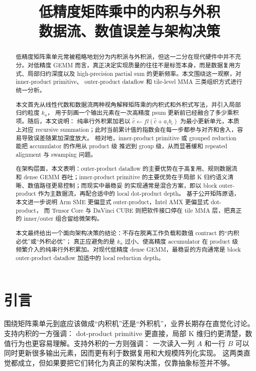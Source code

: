 \documentclass[UTF8,11pt,a4paper]{ctexart}
\title{\textbf{低精度矩阵乘中的内积与外积}\\
\large 数据流、数值误差与架构决策}
\author{}
\date{}
\newcommand{\ku}{\ensuremath{k_u}}
\begin{document}
\maketitle

\begin{abstract}
低精度矩阵乘单元常被粗略地划分为内积派与外积派，但这一二分在现代硬件中并不充分。对低精度
GEMM 而言，真正决定实现质量的往往不是标签本身，而是数据复用方式、局部归约深度以及
high-precision partial sum 的更新频率。本文围绕这一观察，对 inner-product primitive、
outer-product dataflow 和 tile-level MMA 三类组织方式进行统一分析。

本文首先从线性代数和数据流两种视角解释矩阵乘的内积式和外积式写法，并引入局部归约粒度 \ku{}，
用于刻画一个输出元素在一次高精度 psum 更新前已经融合了多少乘积项。随后，本文说明：
纯串行外积累加若以 $\hat{c}\leftarrow fl(\hat{c}+a_ib_i)$ 为最小更新单元，本质上对应
recursive summation；此时当前累计值的指数会在每一步都参与对齐和舍入，容易导致误差随累加深度放大。
相对地，inner-product primitive 或 grouped reduction 能把 accumulator 的作用从 product 级
推迟到 group 级，从而显著缓和 repeated alignment 与 swamping 问题。

在架构层面，本文表明：outer-product dataflow 的主要优势在于高复用、规则数据流和 dense GEMM
吞吐；inner-product primitive 的主要优势在于局部 K 归约语义清晰、数值路径更易控制；而现实中最稳妥
的实现通常是混合方案，即以 block outer-product 作为主数据流，再配合适中的 local dot-product depth。
基于公开矩阵原语，本文进一步说明 Arm SME 更偏显式 outer-product，Intel AMX 更偏显式 dot-product，
而 Tensor Core 与 DaVinci CUBE 则把软件接口停在 tile MMA 层，把真正的 inner/outer 组合留给微架构。

本文最终给出一个面向架构决策的结论：不存在脱离工作负载和数值 contract 的“内积必优”或“外积必优”；
真正应避免的是 \ku{} 过小、使高精度 accumulator 在 product 级频繁介入的纯串行外积累加。对现代低精度
dense GEMM，最稳妥的方向通常是 block outer-product dataflow 加适中的 local reduction depth。
\end{abstract}

\section{引言}

围绕矩阵乘单元到底应该做成“内积机”还是“外积机”，业界长期存在直觉化讨论。支持内积的一方强调：
dot-product primitive 更直接，局部 K 维归约更清楚，数值行为也更容易理解。支持外积的一方则强调：
一次读入一列 $A$ 和一行 $B$ 可以同时更新很多输出元素，因而更有利于数据复用和大规模阵列化实现。
这两类直觉都成立，但如果要把它们转化为真正的架构决策，仅靠抽象标签并不够。
\end{document}
